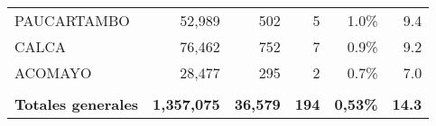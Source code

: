 \begin{tabular}{lrrrrr}
	\cellcolor[HTML]{FFFC9E}PAUCARTAMBO   & 52,989                                                         & 502                                                                             & 5                                                              & 1.0\%                                                                  & 9.4                                                                                                                                \\
	\cellcolor[HTML]{FFFC9E}CALCA         & 76,462                                                         & 752                                                                             & 7                                                              & 0.9\%                                                                  & 9.2                                                                                                                                \\
	\cellcolor[HTML]{FFFC9E}ACOMAYO       & 28,477                                                         & 295                                                                             & 2                                                              & 0.7\%                                                                  & 7.0                                                                                                                                \\
	&                                                                &                                                                                 &                                                                &                                                                        &                                                                                                                                    \\
	\rowcolor[HTML]{ECF4FF} 
	\textbf{Totales generales}            & \textbf{1,357,075}                                             & \textbf{36,579}                                                                 & \textbf{194}                                                   & \textbf{0,53\%}                                                        & \textbf{14.3}                                                                                                                     
\end{tabular}